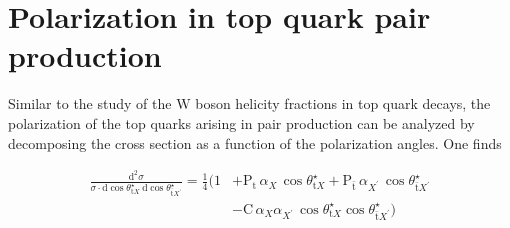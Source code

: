 
\section{Polarization in top quark pair production}


Similar to the study of the $\mathrm{W}$ boson helicity fractions in top quark decays, the polarization of the top quarks arising in pair production can be analyzed by decomposing the \ttbar cross section as a function of the polarization angles. One finds

\begin{align}
\frac{\mathrm{d}^{2}\sigma}{\sigma\cdot\mathrm{d}\cos\theta_{\mathrm{t}X}^\star~\mathrm{d}\cos\theta_{\bar{\mathrm{t}}X^\prime}^\star}=\frac{1}{4}\Big(1&+\mathrm{P}_\mathrm{t}\,\alpha_{X}\,\cos\theta_{\mathrm{t}X}^\star+\mathrm{P}_{\bar{\mathrm{t}}}\,\alpha_{X^\prime}\,\cos\theta_{\bar{\mathrm{t}}X^\prime}^\star \nonumber \\
&-\mathrm{C}\,\alpha_{X}\alpha_{X^\prime}\,\cos\theta_{\mathrm{t}X}^\star \cos\theta_{\bar{\mathrm{t}}X^\prime}^\star\Big) \label{eq:theory-ttbar-correlation}
\end{align}

